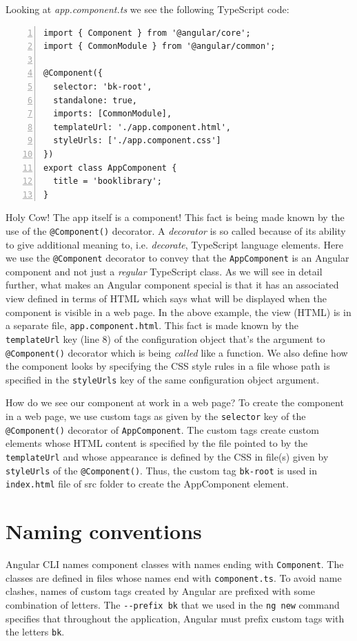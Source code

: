 \documentclass{report}
\begin{document}
Looking at \textsl{app.component.ts} we see the following TypeScript code:
\begin{Verbatim}[numbers=left]
import { Component } from '@angular/core';
import { CommonModule } from '@angular/common';

@Component({
  selector: 'bk-root',
  standalone: true,
  imports: [CommonModule],
  templateUrl: './app.component.html',
  styleUrls: ['./app.component.css']
})
export class AppComponent {
  title = 'booklibrary';
}
\end{Verbatim}

Holy Cow! The app itself is a component! This fact is being made known by the use of the \verb|@Component()| decorator. A \textsl{decorator} is so called because of its ability to give additional meaning to, i.e. \textsl{decorate}, TypeScript language elements. Here we use the \verb|@Component| decorator to convey that the \verb|AppComponent| is an Angular component and not just a \textsl{regular} TypeScript class. As we will see in detail further, what makes an Angular component special is that it has an associated view defined in terms of HTML which says what will be displayed when the component is visible in a web page. In the above example, the view (HTML) is in a separate file, \verb|app.component.html|. This fact is made known by the \verb|templateUrl| key (line 8) of the configuration object that's the argument to \verb|@Component()| decorator which is being \textsl{called} like a function. We also define how the component looks by specifying the CSS style rules in a file whose path is specified in the \verb|styleUrls| key of the same configuration object argument.

How do we see our component at work in a web page? To create the component in a web page, we use custom tags as given by the \verb|selector| key of the \verb|@Component()| decorator of \verb|AppComponent|. The custom tags create custom elements whose HTML content is specified by the file pointed to by the \verb|templateUrl| and whose appearance is defined by the CSS in file(s) given by \verb|styleUrls| of the \verb|@Component()|. Thus, the custom tag \verb|bk-root| is used in \verb|index.html| file of src folder to create the AppComponent element.

\section{Naming conventions}
Angular CLI names component classes with names ending with \verb|Component|. The classes are defined in files whose names end with \verb|component.ts|. To avoid name clashes, names of custom tags created by Angular are prefixed with some combination of letters. The \verb|--prefix bk| that we used in the \verb|ng new| command specifies that throughout the application, Angular must prefix custom tags with the letters \verb|bk|.
\end{document}
